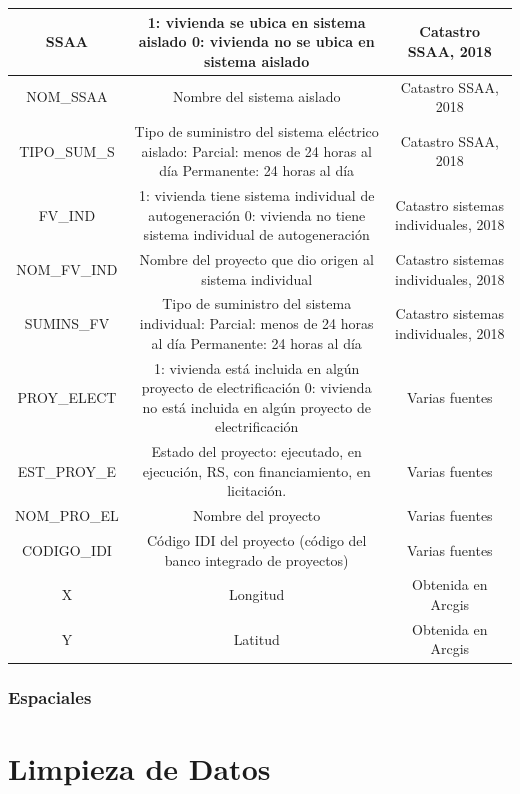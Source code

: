 \documentclass[
]{book}
\begin{document}
\begin{table}
\begin{tabular}{c|c|c}
\hline
SSAA & 1: vivienda se ubica en sistema aislado
0: vivienda no se ubica en sistema aislado & Catastro SSAA, 2018\\
\hline
NOM\_SSAA & Nombre del sistema aislado & Catastro SSAA, 2018\\
\hline
TIPO\_SUM\_S & Tipo de suministro del sistema eléctrico aislado: 
Parcial: menos de 24 horas al día
Permanente: 24 horas al día & Catastro SSAA, 2018\\
\hline
FV\_IND & 1: vivienda tiene sistema individual de autogeneración
0: vivienda no tiene sistema individual de autogeneración & Catastro sistemas individuales, 2018\\
\hline
NOM\_FV\_IND & Nombre del proyecto que dio origen al sistema individual & Catastro sistemas individuales, 2018\\
\hline
SUMINS\_FV & Tipo de suministro del sistema individual: 
Parcial: menos de 24 horas al día
Permanente: 24 horas al día & Catastro sistemas individuales, 2018\\
\hline
PROY\_ELECT & 1: vivienda está incluida en algún proyecto de electrificación
0: vivienda no está incluida en algún proyecto de electrificación & Varias fuentes\\
\hline
EST\_PROY\_E & Estado del proyecto: ejecutado, en ejecución, RS, con financiamiento, en licitación. & Varias fuentes\\
\hline
NOM\_PRO\_EL & Nombre del proyecto & Varias fuentes\\
\hline
CODIGO\_IDI & Código IDI del proyecto (código del banco integrado de proyectos) & Varias fuentes\\
\hline
X & Longitud & Obtenida en Arcgis\\
\hline
Y & Latitud & Obtenida en Arcgis\\
\hline
\end{tabular}
\end{table}

\hypertarget{espaciales}{%
\subsection{Espaciales}\label{espaciales}}

\hypertarget{data_clean}{%
\chapter{Limpieza de Datos}\label{data_clean}}

  
\end{document}
